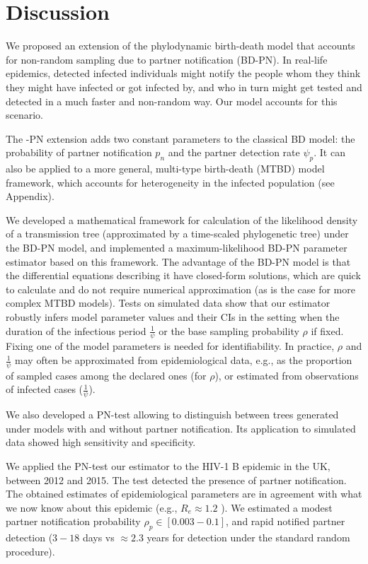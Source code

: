 \documentclass[a4paper,10pt]{article}
\begin{document}
\section{Discussion}
\label{disc}

We proposed an extension of the phylodynamic birth-death model that accounts for non-random sampling due to partner notification (BD-PN). In real-life epidemics, detected infected individuals might notify the people whom they think they might have infected or got infected by, and who in turn might get tested and detected in a much faster and non-random way. Our model accounts for this scenario.

The -PN extension adds two constant parameters to the classical BD model: the probability of partner notification $p_n$ and the partner detection rate $\psi_p$. It can also be applied to a more general, multi-type birth-death (MTBD) model framework, which accounts for heterogeneity in the infected population (see Appendix). 

We developed a mathematical framework for calculation of the likelihood density of a transmission tree (approximated by a time-scaled phylogenetic tree) under the BD-PN model, and implemented a maximum-likelihood BD-PN parameter estimator based on this framework. The advantage of the BD-PN model is that the differential equations describing it have closed-form solutions, which are quick to calculate and do not require numerical approximation (as is the case for more complex MTBD models). Tests on simulated data show that our estimator robustly infers model parameter values and their CIs in the setting when the duration of the infectious period $\frac{1}{\psi}$ or the base sampling probability $\rho$ if fixed. Fixing one of the model parameters is needed for identifiability. In practice, $\rho$ and $\frac{1}{\psi}$ may often be approximated from epidemiological data, e.g., as the proportion of sampled cases among the declared ones (for $\rho$), or estimated from observations of infected cases ($\frac{1}{\psi}$). 

We also developed a PN-test allowing to distinguish between trees generated under models with and without partner notification. Its application to simulated data showed high sensitivity and specificity. 

We applied the PN-test our estimator to the HIV-1 B epidemic in the UK, between 2012 and 2015. The test detected the presence of partner notification. The obtained estimates of epidemiological parameters are in agreement with what we now know about this epidemic (e.g., $R_e \approx 1.2$ ). We estimated a modest partner notification probability $\rho_p \in [0.003-0.1]$, and rapid notified partner detection ($3-18$ days vs $\approx2.3$ years for detection under the standard random procedure).
\end{document}
